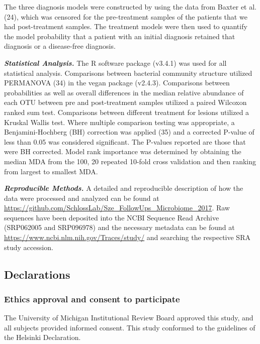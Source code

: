 \documentclass[12pt,]{article}
\begin{document}
The three diagnosis models were constructed by using the data from
Baxter et al. (24), which was censored for the pre-treatment samples of
the patients that we had post-treatment samples. The treatment models
were then used to quantify the model probability that a patient with an
initial diagnosis retained that diagnosis or a disease-free diagnosis.

\textbf{\emph{Statistical Analysis.}} The R software package (v3.4.1)
was used for all statistical analysis. Comparisons between bacterial
community structure utilized PERMANOVA (34) in the vegan package
(v2.4.3). Comparisons between probabilities as well as overall
differences in the median relative abundance of each OTU between pre and
post-treatment samples utilized a paired Wilcoxon ranked sum test.
Comparisons between different treatment for lesions utilized a Kruskal
Wallis test. Where multiple comparison testing was appropriate, a
Benjamini-Hochberg (BH) correction was applied (35) and a corrected
P-value of less than 0.05 was considered significant. The P-values
reported are those that were BH corrected. Model rank importance was
determined by obtaining the median MDA from the 100, 20 repeated 10-fold
cross validation and then ranking from largest to smallest MDA.

\textbf{\emph{Reproducible Methods.}} A detailed and reproducible
description of how the data were processed and analyzed can be found at
\url{https://github.com/SchlossLab/Sze_FollowUps_Microbiome_2017}. Raw
sequences have been deposited into the NCBI Sequence Read Archive
(SRP062005 and SRP096978) and the necessary metadata can be found at
\url{https://www.ncbi.nlm.nih.gov/Traces/study/} and searching the
respective SRA study accession.

\newpage

\subsection{Declarations}\label{declarations}

\subsubsection{Ethics approval and consent to
participate}\label{ethics-approval-and-consent-to-participate}

The University of Michigan Institutional Review Board approved this
study, and all subjects provided informed consent. This study conformed
to the guidelines of the Helsinki Declaration.
\end{document}
